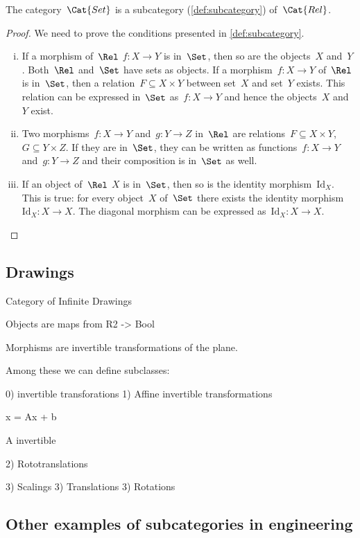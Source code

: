 \begin{lemma}
    The category~$\Cat{Set}$ is a subcategory (\cref{def:subcategory}) of~$\Cat{Rel}$.
\end{lemma}
\begin{proof}
	We need to prove the conditions presented in \cref{def:subcategory}.
	\begin{enumerate}[(i)]
	\item If a morphism of~$\Rel$ $f \colon X\to Y$ is in~$\Set$, then so are the objects~$X$ and~$Y$. Both~$\Rel$ and~$\Set$ have sets as objects. If a morphism~$f\colon X\to Y$ of~$\Rel$ is in~$\Set$, then a relation~$F\subseteq X\times Y$ between set~$X$ and set~$Y$ exists. This relation can be expressed in~$\Set$ as~$f\colon X\to Y$ and hence the objects~$X$ and~$Y$ exist.
	\item Two morphisms~$f\colon X\to Y$ and~$g\colon Y\to Z$ in~$\Rel$ are relations~$F\subseteq X\times Y$,~$G\subseteq Y\times Z$. If they are in~$\Set$, they can be written as functions~$f\colon X\to Y$ and~$g\colon Y\to Z$ and their composition is in~$\Set$ as well. 
	\item If an object of~$\Rel$ $X$ is in~$\Set$, then so is the identity morphism~$\text{Id}_X$. This is true: for every object~$X$ of~$\Set$ there exists the identity morphism~$\text{Id}_X\colon X\to X$. The diagonal morphism can be expressed as~$\text{Id}_X\colon X\to X$.
	\end{enumerate}
\end{proof}


\subsection{Drawings}


Category of Infinite Drawings

Objects are maps from R2 -> Bool 

Morphisms are invertible transformations of the plane. 

Among these we can define subclasses:

0) invertible transforations
1) Affine invertible transformations 

x = Ax + b

A invertible

2) Rototranslations

3) Scalings 
3) Translations
3) Rotations




\subsection{Other examples of subcategories in engineering}

